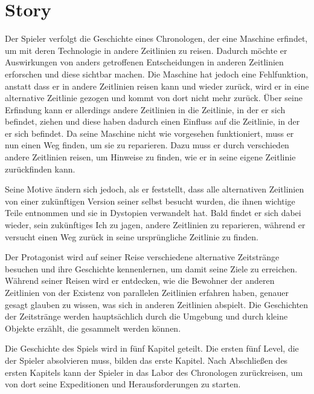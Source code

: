 \section{Story}
Der Spieler verfolgt die Geschichte eines Chronologen, der eine Maschine erfindet, um mit deren Technologie in andere Zeitlinien zu reisen. Dadurch möchte er Auswirkungen von anders getroffenen Entscheidungen in anderen Zeitlinien erforschen und diese sichtbar machen. Die Maschine hat jedoch eine Fehlfunktion, anstatt dass er in andere Zeitlinien reisen kann und wieder zurück, wird er in eine alternative Zeitlinie gezogen und kommt von dort nicht mehr zurück. Über seine Erfindung kann er allerdings andere Zeitlinien in die Zeitlinie, in der er sich befindet, ziehen und diese haben dadurch einen Einfluss auf die Zeitlinie, in der er sich befindet. Da seine Maschine nicht wie vorgesehen funktioniert, muss er nun einen Weg finden, um sie zu reparieren. Dazu muss er durch verschieden andere Zeitlinien reisen, um Hinweise zu finden, wie er in seine eigene Zeitlinie zurückfinden kann.

Seine Motive ändern sich jedoch, als er feststellt, dass alle alternativen Zeitlinien von einer zukünftigen Version seiner selbst besucht wurden, die ihnen wichtige Teile entnommen und sie in Dystopien verwandelt hat. Bald findet er sich dabei wieder, sein zukünftiges Ich zu jagen, andere Zeitlinien zu reparieren, während er versucht einen Weg zurück in seine ursprüngliche Zeitlinie zu finden.

Der Protagonist wird auf seiner Reise verschiedene alternative Zeitstränge besuchen und ihre Geschichte kennenlernen, um damit seine Ziele zu erreichen. Während seiner Reisen wird er entdecken, wie die Bewohner der anderen Zeitlinien von der Existenz von parallelen Zeitlinien erfahren haben, genauer gesagt glauben zu wissen, was sich in anderen Zeitlinien abspielt. Die Geschichten der Zeitstränge werden hauptsächlich durch die Umgebung und durch kleine Objekte erzählt, die gesammelt werden können. 

Die Geschichte des Spiels wird in fünf Kapitel geteilt. Die ersten fünf Level, die der Spieler absolvieren muss, bilden das erste Kapitel. Nach Abschließen des ersten Kapitels kann der Spieler in das Labor des Chronologen zurückreisen, um von dort seine Expeditionen und Herausforderungen zu starten.

